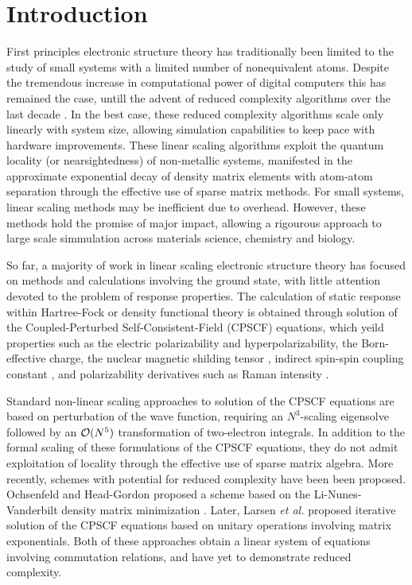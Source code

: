 \documentclass[prl,aps,letterpaper,twocolumn,showpacs,twocolumngrid,superbib]{revtex4}
\begin{document}
\section{Introduction}
First principles electronic structure theory has traditionally been limited 
to the study of small systems with a limited number of nonequivalent atoms. 
Despite the tremendous increase in computational power of digital computers this 
has remained the case, untill the advent of reduced complexity algorithms over the
last decade \cite{GGalli96,DBowler97,SGoedecker99,POrdejon00,VGogonea01,SWu02}. In the 
best case, these reduced complexity algorithms scale only linearly with system size, 
allowing simulation capabilities to keep pace with hardware improvements.
These linear scaling algorithms exploit the quantum locality (or nearsightedness) of 
non-metallic systems,  manifested in the approximate exponential decay of density matrix elements 
with atom-atom separation through the effective use of sparse matrix methods. For small systems,
linear scaling methods may be inefficient due to overhead.  However, these methods hold the promise 
of major impact, allowing a rigourous approach to large scale simmulation across materials science, 
chemistry and biology. 

So far, a majority of work in linear scaling electronic structure theory 
has focused on methods and calculations involving the ground state, with little 
attention devoted to the problem of response properties.  The calculation of static
response within  Hartree-Fock or density functional theory is obtained through solution 
of the Coupled-Perturbed Self-Consistent-Field (CPSCF) equations, which yeild properties 
such as the electric polarizability and hyperpolarizability, the Born-effective charge, 
the nuclear magnetic shilding tensor \cite{Pulay_1990}, indirect spin-spin coupling
constant \cite{Pennington_1991,Malkin_1996}, and polarizability derivatives such as 
Raman intensity \cite{Lazzeri_2003,Champagne_2001}.


\newpage

Standard non-linear scaling approaches to solution of the CPSCF equations 
\cite{Pople_1979,Sekino_1986,Dupuis_1991} are based on perturbation of the wave 
function, requiring an $N^3$-scaling eigensolve followed by an ${\cal O}(N^5)$ 
transformation of two-electron integrals. In addition to the formal scaling of 
these formulations of the CPSCF equations, they do not admit exploitation 
of locality through the effective use of sparse matrix algebra.  More recently,
schemes with potential for reduced complexity have been been proposed.
Ochsenfeld and Head-Gordon proposed a scheme based on the Li-Nunes-Vanderbilt 
density matrix minimization \cite{Ochsenfeld97}.  Later, Larsen {\em et al.} \cite{Helgaker_2001} 
proposed iterative solution of the CPSCF equations based on unitary operations
involving matrix exponentials.  Both of these approaches obtain a linear 
system of equations involving commutation relations, and have yet to demonstrate 
reduced complexity.  
\end{document}
